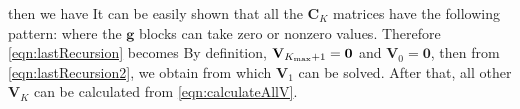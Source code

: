then we have
It can be easily shown that all the $\mathbf{C}_{K}$ matrices have the following pattern:
where the $\mathbf{g}$ blocks can take zero or nonzero values. Therefore \autoref{eqn:lastRecursion} becomes
By definition, $\mathbf{V}_{K_{\rm max}+1} = \mathbf{0}$ and $\mathbf{V}_{0} = \mathbf{0}$, then from 
\autoref{eqn:lastRecursion2}, we obtain
from which $\mathbf{V}_{1}$ can be solved. After that, all other $\mathbf{V}_K$ can be calculated from \autoref{eqn:calculateAllV}. 

